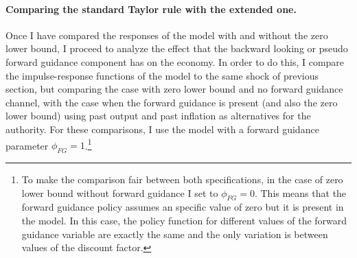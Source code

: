 \documentclass[12pt]{article}
\numberwithin{equation}{section}
\begin{document}
\paragraph{Comparing the standard Taylor rule with the extended one.} Once I have compared the responses of the model with and without the zero lower bound, I proceed to analyze the effect that the backward looking or pseudo forward guidance component has on the economy. In order to do this, I compare the impulse-response functions of the model to the same shock of previous section, but comparing the case with zero lower bound and no forward guidance channel, with the case when the forward guidance is present (and also the zero lower bound) using past output and past inflation as alternatives for the authority. For these comparisons, I use the model with a forward guidance parameter $\phi_{FG}=1$.\footnote{To make the comparison fair between both specifications, in the case of zero lower bound without forward guidance I set to $\phi_{FG}=0$. This means that the forward guidance policy assumes an specific value of zero but it is present in the model. In this case, the policy function for different values of the forward guidance variable are exactly the same and the only variation is between values of the discount factor.}
\end{document}
